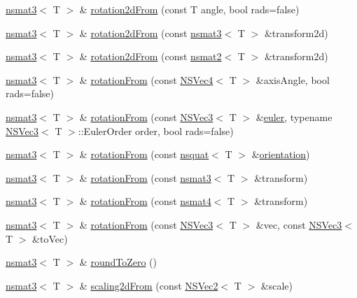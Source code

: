 \begin{DoxyCompactItemize}
\item 
\hyperlink{structnsmat3}{nsmat3}$<$ T $>$ \& \hyperlink{structnsmat3_a7f382e747c4eb33b0b943f565b9ba29e}{rotation2d\-From} (const T angle, bool rads=false)
\item 
\hyperlink{structnsmat3}{nsmat3}$<$ T $>$ \& \hyperlink{structnsmat3_a215a7bb4a68e5f2a34f1b2d306a76872}{rotation2d\-From} (const \hyperlink{structnsmat3}{nsmat3}$<$ T $>$ \&transform2d)
\item 
\hyperlink{structnsmat3}{nsmat3}$<$ T $>$ \& \hyperlink{structnsmat3_a80be7da85f2605a2bcb5acd1ed8dea86}{rotation2d\-From} (const \hyperlink{structnsmat2}{nsmat2}$<$ T $>$ \&transform2d)
\item 
\hyperlink{structnsmat3}{nsmat3}$<$ T $>$ \& \hyperlink{structnsmat3_a22013b44fefa19d93312d387bb2589e3}{rotation\-From} (const \hyperlink{structNSVec4}{N\-S\-Vec4}$<$ T $>$ \&axis\-Angle, bool rads=false)
\item 
\hyperlink{structnsmat3}{nsmat3}$<$ T $>$ \& \hyperlink{structnsmat3_a8d3f2bfee83cd3cb76738fed993d240b}{rotation\-From} (const \hyperlink{structNSVec3}{N\-S\-Vec3}$<$ T $>$ \&\hyperlink{nsvec3_8h_ac03cece5b2ce21941bb4b4a02ea7e2b6}{euler}, typename \hyperlink{structNSVec3}{N\-S\-Vec3}$<$ T $>$\-::Euler\-Order order, bool rads=false)
\item 
\hyperlink{structnsmat3}{nsmat3}$<$ T $>$ \& \hyperlink{structnsmat3_a1b128065aa02aac1860e0125c110c615}{rotation\-From} (const \hyperlink{structnsquat}{nsquat}$<$ T $>$ \&\hyperlink{nsquat_8h_af20bc5e18c379261a387ab197e9b971f}{orientation})
\item 
\hyperlink{structnsmat3}{nsmat3}$<$ T $>$ \& \hyperlink{structnsmat3_af08ab0002a8c3a0045e1b9e3f6a0fe5b}{rotation\-From} (const \hyperlink{structnsmat3}{nsmat3}$<$ T $>$ \&transform)
\item 
\hyperlink{structnsmat3}{nsmat3}$<$ T $>$ \& \hyperlink{structnsmat3_a2e29c30b86f43207751d6dbecf86d113}{rotation\-From} (const \hyperlink{structnsmat4}{nsmat4}$<$ T $>$ \&transform)
\item 
\hyperlink{structnsmat3}{nsmat3}$<$ T $>$ \& \hyperlink{structnsmat3_a45400e7f68ca239d0303fb3b338fcc9c}{rotation\-From} (const \hyperlink{structNSVec3}{N\-S\-Vec3}$<$ T $>$ \&vec, const \hyperlink{structNSVec3}{N\-S\-Vec3}$<$ T $>$ \&to\-Vec)
\item 
\hyperlink{structnsmat3}{nsmat3}$<$ T $>$ \& \hyperlink{structnsmat3_ad87dd3e2c2dbbb3da83c1fb8589f9bf0}{round\-To\-Zero} ()
\item 
\hyperlink{structnsmat3}{nsmat3}$<$ T $>$ \& \hyperlink{structnsmat3_a9879e479baf8b130fc7c5d3f4ef90ebe}{scaling2d\-From} (const \hyperlink{structNSVec2}{N\-S\-Vec2}$<$ T $>$ \&scale)

\end{DoxyCompactItemize}
